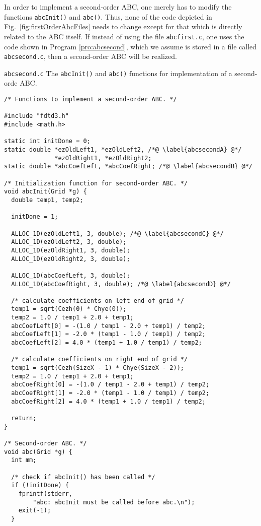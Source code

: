 In order to implement a second-order ABC, one merely has to modify the
functions {\tt abcInit()} and {\tt abc()}.  Thus, none of the code
depicted in Fig.\ \ref{fig:firstOrderAbcFiles} needs to change except
for that which is directly related to the ABC itself.  If instead of
using the file {\tt abcfirst.c}, one uses the code shown in Program
\ref{pro:abcsecond}, which we assume is stored in a file called {\tt
abcsecond.c}, then a second-order ABC will be realized.

\begin{program}
{\tt abcsecond.c} The {\tt abcInit()} and {\tt abc()} functions for
implementation of a second-orde ABC.
\label{pro:abcsecond}
\codemiddle
\begin{lstlisting}
/* Functions to implement a second-order ABC. */

#include "fdtd3.h"
#include <math.h>

static int initDone = 0;
static double *ezOldLeft1, *ezOldLeft2, /*@ \label{abcsecondA} @*/
              *ezOldRight1, *ezOldRight2;
static double *abcCoefLeft, *abcCoefRight; /*@ \label{abcsecondB} @*/

/* Initialization function for second-order ABC. */
void abcInit(Grid *g) {
  double temp1, temp2;
  
  initDone = 1;

  ALLOC_1D(ezOldLeft1, 3, double); /*@ \label{abcsecondC} @*/
  ALLOC_1D(ezOldLeft2, 3, double);
  ALLOC_1D(ezOldRight1, 3, double);
  ALLOC_1D(ezOldRight2, 3, double);

  ALLOC_1D(abcCoefLeft, 3, double);
  ALLOC_1D(abcCoefRight, 3, double); /*@ \label{abcsecondD} @*/

  /* calculate coefficients on left end of grid */
  temp1 = sqrt(Cezh(0) * Chye(0));
  temp2 = 1.0 / temp1 + 2.0 + temp1;
  abcCoefLeft[0] = -(1.0 / temp1 - 2.0 + temp1) / temp2;
  abcCoefLeft[1] = -2.0 * (temp1 - 1.0 / temp1) / temp2;
  abcCoefLeft[2] = 4.0 * (temp1 + 1.0 / temp1) / temp2;

  /* calculate coefficients on right end of grid */
  temp1 = sqrt(Cezh(SizeX - 1) * Chye(SizeX - 2));
  temp2 = 1.0 / temp1 + 2.0 + temp1;
  abcCoefRight[0] = -(1.0 / temp1 - 2.0 + temp1) / temp2;
  abcCoefRight[1] = -2.0 * (temp1 - 1.0 / temp1) / temp2;
  abcCoefRight[2] = 4.0 * (temp1 + 1.0 / temp1) / temp2;

  return;
}

/* Second-order ABC. */
void abc(Grid *g) {
  int mm;

  /* check if abcInit() has been called */
  if (!initDone) {
    fprintf(stderr,
	    "abc: abcInit must be called before abc.\n");
    exit(-1);
  }


\end{lstlisting}
\end{program}

